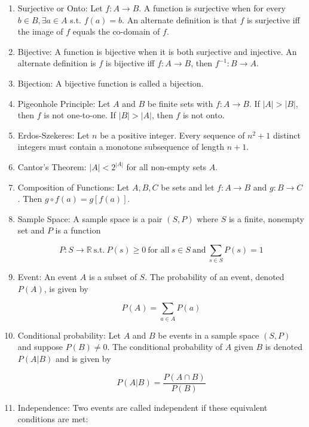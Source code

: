 \documentclass{article}
\begin{document}
\begin{enumerate}
    \item Surjective or Onto: Let $f:A\to B$.
    A function is surjective when for every $b\in B, \exists a\in A$ s.t. $f(a)=b$.
    An alternate definition is that $f$ is surjective iff the image of $f$ equals the co-domain of $f$.

    \item Bijective: A function is bijective when it is both surjective and injective.
    An alternate definition is $f$ is bijective iff $f:A\to B$, then $f^{-1}:B\to A$.

    \item Bijection: A bijective function is called a bijection.

    \item Pigeonhole Principle: Let $A$ and $B$ be finite sets with $f:A\to B$.
    If $|A|>|B|$, then $f$ is not one-to-one.
    If $|B|>|A|$, then $f$ is not onto.

    \item Erdos-Szekeres: Let $n$ be a positive integer.
    Every sequence of $n^2+1$ distinct integers must contain a monotone subsequence of length $n+1$.

    \item Cantor's Theorem: $|A|<2^{|A|}$ for all non-empty sets $A$.

    \item Composition of Functions: Let $A,B,C$ be sets and let $f:A\to B$ and $g:B\to C$.
    Then $g\circ f(a)=g[f(a)]$.

    \item Sample Space: A sample space is a pair $(S,P)$ where $S$ is a finite, nonempty set and $P$ is a function

    \[P:S\to\mathbb{R}\: \text{s.t.}\: P(s)\geq 0 \: \text{for all}\: s\in S \:\text{and}\: \sum_{s\in S}P(s)=1\]

    \item Event: An event $A$ is a subset of $S$.
    The probability of an event, denoted $P(A)$, is given by

    \[P(A)=\sum_{a\in A}P(a)\]

    \item Conditional probability: Let $A$ and $B$ be events in a sample space $(S,P)$ and suppose $P(B)\neq 0$.
    The conditional probability of $A$ given $B$ is denoted $P(A|B)$ and is given by

    \[P(A|B)=\frac{P(A\cap B)}{P(B)}\]

    \item Independence: Two events are called independent if these equivalent conditions are met:


\end{enumerate}
\end{document}
